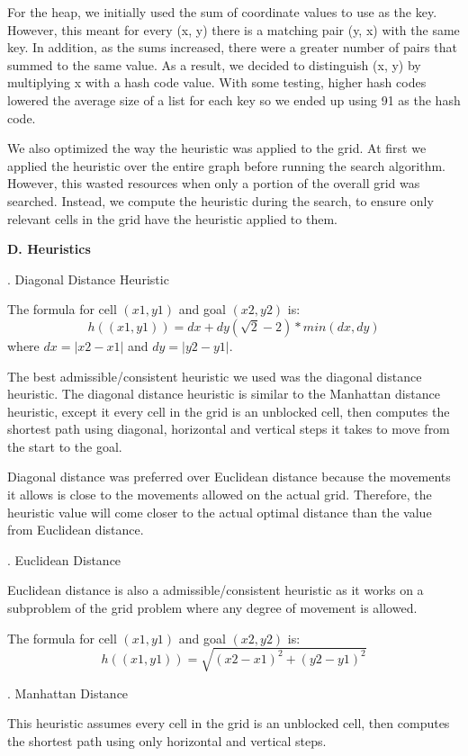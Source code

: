 \documentclass[12pt, letterpaper]{article}
\begin{document}
For the heap, we initially used the sum of coordinate values to use as the key. However, this meant for every (x, y) there is a matching pair (y, x) with the same key. In addition, as the sums increased, there were a greater number of pairs that summed to the same value. As a result, we decided to distinguish (x, y) by multiplying x with a hash code value. With some testing, higher hash codes lowered the average size of a list for each key so we ended up using 91 as the hash code. 

We also optimized the way the heuristic was applied to the grid. At first we applied the heuristic over the entire graph before running the search algorithm. However, this wasted resources when only a portion of the overall grid was searched. Instead, we compute the heuristic during the search, to ensure only relevant cells in the grid have the heuristic applied to them.

\pagebreak %

\noindent \textbf{D. Heuristics}

. Diagonal Distance Heuristic

The formula for cell $(x1,y1)$ and goal $(x2, y2)$ is:
$$h((x1, y1)) = dx + dy (\sqrt{2} - 2) * min(dx, dy)$$
where $dx = |x2 - x1|$ and $dy = |y2 - y1|$.

The best admissible/consistent heuristic we used was the diagonal distance heuristic. The diagonal distance heuristic is similar to the Manhattan distance heuristic, except it every cell in the grid is an unblocked cell, then computes the shortest path using diagonal, horizontal and vertical steps it takes to move from the start to the goal. 

Diagonal distance was preferred over Euclidean distance because the movements it allows is close to the movements allowed on the actual grid. Therefore, the heuristic value will come closer to the actual optimal distance than the value from Euclidean distance.

\bigskip
{}. Euclidean Distance

Euclidean distance is also a admissible/consistent heuristic as it works on a subproblem of the grid problem where any degree of movement is allowed.

The formula for cell $(x1, y1)$ and goal $(x2, y2)$ is:
$$h((x1,y1)) = \sqrt{(x2-x1)^2 + (y2-y1)^2}$$

\bigskip
{}. Manhattan Distance

This heuristic assumes every cell in the grid is an unblocked cell, then computes the shortest path using only horizontal and vertical steps.
\end{document}
